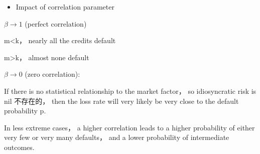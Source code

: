 \begin{itemize}
\begin{itemize}
\item Impact of correlation parameter
\end{itemize}

\(\beta  \rightarrow  1\) (perfect correlation)

m<k， nearly all the credits default

m>k， almost none default

\(\beta  \rightarrow  0\) (zero correlation):

If there is no statistical relationship to the market factor， so idiosyncratic risk is nil 不存在的， then the loss rate will very likely be very close to the default probability p.

In less extreme cases， a higher correlation leads to a higher probability of either very few or very many defaults， and a lower probability of intermediate outcomes.


\end{itemize}

